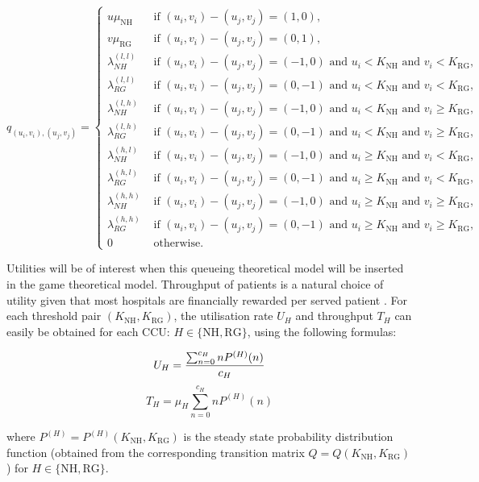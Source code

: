 \documentclass{article}
\newcommand{\NH}{\text{NH}}
\newcommand{\RG}{\text{RG}}
\begin{document}
\begin{equation}
q_{(u_i,v_i),(u_j,v_j)}=\begin{cases} u\mu_{\NH} & \text{ if  } (u_i,v_i)-(u_j,v_j)=(1,0),\\
 v\mu_{\RG} & \text{ if  } (u_i,v_i)-(u_j,v_j)=(0,1),\\
 \lambda_{NH}^{(l,l)} & \text{ if  } (u_i,v_i)-(u_j,v_j)=(-1,0)  \text{ and  } u_i < K_{\NH}  \text{ and  } v_i < K_{\RG},\\
 \lambda_{RG}^{(l,l)} & \text{ if  } (u_i,v_i)-(u_j,v_j)=(0,-1)  \text{ and  } u_i < K_{\NH}  \text{ and  } v_i < K_{\RG},\\
\lambda_{NH}^{(l,h)} & \text{ if  } (u_i,v_i)-(u_j,v_j)=(-1,0) \text{ and  } u_i < K_{\NH}  \text{ and  } v_i \geq K_{\RG},\\
\lambda_{RG}^{(l,h)} & \text{ if  } (u_i,v_i)-(u_j,v_j)=(0,-1) \text{ and  } u_i < K_{\NH}  \text{ and  } v_i \geq K_{\RG},\\
\lambda_{NH}^{(h,l)} & \text{ if  } (u_i,v_i)-(u_j,v_j)=(-1,0) \text{ and  } u_i \geq K_{\NH}  \text{ and  } v_i < K_{\RG},\\
\lambda_{RG}^{(h,l)} & \text{ if  } (u_i,v_i)-(u_j,v_j)=(0,-1) \text{ and  } u_i \geq K_{\NH}  \text{ and  } v_i < K_{\RG},\\
\lambda_{NH}^{(h,h)} & \text{ if  } (u_i,v_i)-(u_j,v_j)=(-1,0) \text{ and  } u_i \geq K_{\NH}  \text{ and  } v_i \geq K_{\RG},\\
\lambda_{RG}^{(h,h)} & \text{ if  } (u_i,v_i)-(u_j,v_j)=(0,-1) \text{ and  } u_i \geq K_{\NH}  \text{ and  } v_i \geq K_{\RG},\\
0 & \text{ otherwise}.
\end{cases}
\end{equation}

Utilities will be of interest when this queueing theoretical model will be inserted in the game theoretical model.
Throughput of patients is a natural choice of utility given that most hospitals are financially rewarded per served patient \cite{Pate2009}.
For each threshold pair $(K_{\NH},K_{\RG})$, the utilisation rate $U_H$ and throughput $T_H$ can easily be obtained for each CCU: $H\in\{\text{NH},\text{RG}\}$, using the following formulas:

$$U_{H}={{\sum_{n=0}^{c_H} nP^{(H)}(n)}\over{c_{H}}}$$
$$T_{H}=\mu_H \sum _{n=0}^{c_H} nP^{(H)}(n)$$

where $P^{(H)}=P^{(H)}(K_{\NH},K_{\RG})$ is the steady state probability distribution function (obtained from the corresponding transition matrix $Q=Q(K_{\NH},K_{\RG})$) for $H\in\{\text{NH},\text{RG}\}$.
\end{document}
